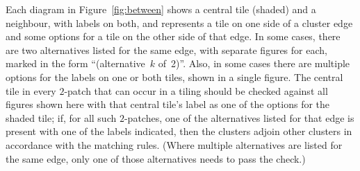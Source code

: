 Each diagram in Figure~\ref{fig:between} shows a central tile (shaded)
and a neighbour, with labels on both, and represents a tile on one
side of a cluster edge and some options for a tile on the other side
of that edge.  In some cases, there are two alternatives listed
for the same edge, with separate figures for each, marked in the form
``(alternative~$k$ of~2)''.  Also, in some cases there are multiple 
options for the labels on one or both tiles, shown in a single figure.  The
central tile in every $2$-patch that can occur in a tiling should be
checked against all figures shown here with that central tile's label
as one of the options for the shaded tile; if, for all such
$2$-patches, one of the alternatives listed for that edge is present
with one of the labels indicated, then the clusters adjoin other
clusters in accordance with the matching rules.  (Where multiple
alternatives are listed for the same edge, only one of those
alternatives needs to pass the check.)



\FloatBarrier
